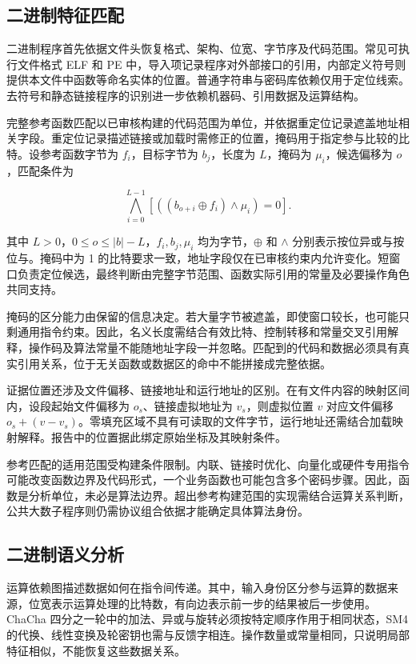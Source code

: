 \subsection{二进制特征匹配}

二进制程序首先依据文件头恢复格式、架构、位宽、字节序及代码范围。常见可执行文件格式 ELF 和 PE 中，导入项记录程序对外部接口的引用，内部定义符号则提供本文件中函数等命名实体的位置。普通字符串与密码库依赖仅用于定位线索。去符号和静态链接程序的识别进一步依赖机器码、引用数据及运算结构\cite{yara-docs}。

完整参考函数匹配以已审核构建的代码范围为单位，并依据重定位记录遮盖地址相关字段。重定位记录描述链接或加载时需修正的位置，掩码用于指定参与比较的比特。设参考函数字节为 $f_i$，目标字节为 $b_j$，长度为 $L$，掩码为 $\mu_i$，候选偏移为 $o$，匹配条件为

\begin{equation}
  \bigwedge_{i=0}^{L-1}
  \left[((b_{o+i}\oplus f_i)\land\mu_i)=0\right].
  \label{eq:masked-function-match}
\end{equation}

其中 $L>0$，$0\leq o\leq |b|-L$，$f_i,b_j,\mu_i$ 均为字节，$\oplus$ 和 $\land$ 分别表示按位异或与按位与。掩码中为 1 的比特要求一致，地址字段仅在已审核约束内允许变化。短窗口负责定位候选，最终判断由完整字节范围、函数实际引用的常量及必要操作角色共同支持。

掩码的区分能力由保留的信息决定。若大量字节被遮盖，即使窗口较长，也可能只剩通用指令约束。因此，名义长度需结合有效比特、控制转移和常量交叉引用解释，操作码及算法常量不能随地址字段一并忽略。匹配到的代码和数据必须具有真实引用关系，位于无关函数或数据区的命中不能拼接成完整依据。

证据位置还涉及文件偏移、链接地址和运行地址的区别。在有文件内容的映射区间内，设段起始文件偏移为 $o_s$、链接虚拟地址为 $v_s$，则虚拟位置 $v$ 对应文件偏移 $o_s+(v-v_s)$。零填充区域不具有可读取的文件字节，运行地址还需结合加载映射解释。报告中的位置据此绑定原始坐标及其映射条件。

参考匹配的适用范围受构建条件限制。内联、链接时优化、向量化或硬件专用指令可能改变函数边界及代码形式，一个业务函数也可能包含多个密码步骤。因此，函数是分析单位，未必是算法边界。超出参考构建范围的实现需结合运算关系判断，公共大数子程序则仍需协议组合依据才能确定具体算法身份。

\subsection{二进制语义分析}

运算依赖图描述数据如何在指令间传递。其中，输入身份区分参与运算的数据来源，位宽表示运算处理的比特数，有向边表示前一步的结果被后一步使用。ChaCha 四分之一轮中的加法、异或与旋转必须按特定顺序作用于相同状态，SM4 的代换、线性变换及轮密钥也需与反馈字相连。操作数量或常量相同，只说明局部特征相似，不能恢复这些数据关系。

